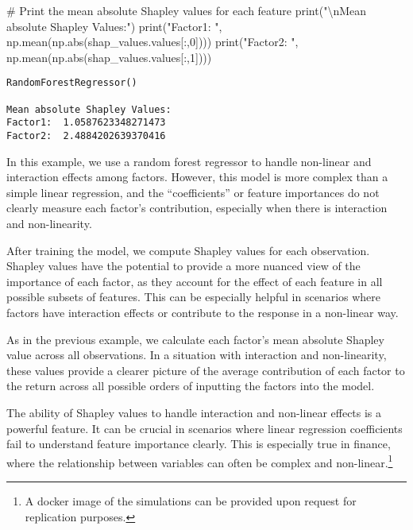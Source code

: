 \documentclass[
  letterpaper,
  DIV=11,
  numbers=noendperiod]{scrartcl}
\newenvironment{Shaded}{\begin{snugshade}}{\end{snugshade}}
\newcommand{\BuiltInTok}[1]{\textcolor[rgb]{0.00,0.23,0.31}{#1}}
\newcommand{\CharTok}[1]{\textcolor[rgb]{0.13,0.47,0.30}{#1}}
\newcommand{\CommentTok}[1]{\textcolor[rgb]{0.37,0.37,0.37}{#1}}
\newcommand{\DecValTok}[1]{\textcolor[rgb]{0.68,0.00,0.00}{#1}}
\newcommand{\InformationTok}[1]{\textcolor[rgb]{0.37,0.37,0.37}{#1}}
\newcommand{\NormalTok}[1]{\textcolor[rgb]{0.00,0.23,0.31}{#1}}
\newcommand{\StringTok}[1]{\textcolor[rgb]{0.13,0.47,0.30}{#1}}
\begin{document}
\begin{Shaded}
\begin{Highlighting}[]
\CommentTok{\# Print the mean absolute Shapley values for each feature}
\BuiltInTok{print}\NormalTok{(}\StringTok{"}\CharTok{\textbackslash{}n}\StringTok{Mean absolute Shapley Values:"}\NormalTok{)}
\BuiltInTok{print}\NormalTok{(}\StringTok{"Factor1: "}\NormalTok{, np.mean(np.}\BuiltInTok{abs}\NormalTok{(shap\_values.values[:,}\DecValTok{0}\NormalTok{])))}
\BuiltInTok{print}\NormalTok{(}\StringTok{"Factor2: "}\NormalTok{, np.mean(np.}\BuiltInTok{abs}\NormalTok{(shap\_values.values[:,}\DecValTok{1}\NormalTok{])))}
\InformationTok{\textasciigrave{}\textasciigrave{}\textasciigrave{}}
\end{Highlighting}
\end{Shaded}

\begin{verbatim}
RandomForestRegressor()

Mean absolute Shapley Values:
Factor1:  1.0587623348271473
Factor2:  2.4884202639370416
\end{verbatim}

In this example, we use a random forest regressor to handle non-linear
and interaction effects among factors. However, this model is more
complex than a simple linear regression, and the ``coefficients'' or
feature importances do not clearly measure each factor's contribution,
especially when there is interaction and non-linearity.

After training the model, we compute Shapley values for each
observation. Shapley values have the potential to provide a more nuanced
view of the importance of each factor, as they account for the effect of
each feature in all possible subsets of features. This can be especially
helpful in scenarios where factors have interaction effects or
contribute to the response in a non-linear way.

As in the previous example, we calculate each factor's mean absolute
Shapley value across all observations. In a situation with interaction
and non-linearity, these values provide a clearer picture of the average
contribution of each factor to the return across all possible orders of
inputting the factors into the model.

The ability of Shapley values to handle interaction and non-linear
effects is a powerful feature. It can be crucial in scenarios where
linear regression coefficients fail to understand feature importance
clearly. This is especially true in finance, where the relationship
between variables can often be complex and non-linear.\footnote{A docker
  image of the simulations can be provided upon request for replication
  purposes.}
\end{document}
